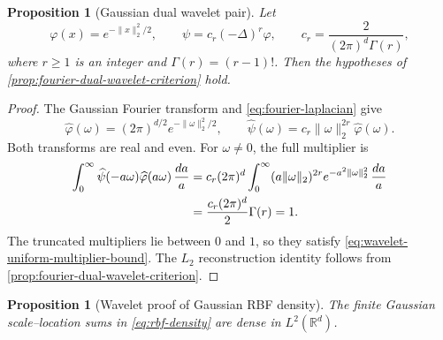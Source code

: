 \documentclass[11pt,twoside]{article}
\newcommand{\R}{\mathbb R}
\newtheorem{proposition}[theorem]{Proposition}
\theoremstyle{definition}
\theoremstyle{remark}
\begin{document}
\begin{proposition}[Gaussian dual wavelet pair]
\label{prop:gaussian-wavelet-verification}
Let
\begin{equation}
 \varphi(x)=e^{-\|x\|_2^2/2},
 \qquad
 \psi=c_r(-\Delta)^r\varphi,
 \qquad
 c_r=\frac{2}{(2\pi)^d\Gamma(r)},
 \label{eq:normalized-gaussian-wavelet-pair}
\end{equation}
where $r\geq1$ is an integer and $\Gamma(r)=(r-1)!$. Then the hypotheses of
\cref{prop:fourier-dual-wavelet-criterion} hold.
\end{proposition}

\begin{proof}
The Gaussian Fourier transform and \cref{eq:fourier-laplacian} give
\begin{equation}
 \widehat\varphi(\omega)=(2\pi)^{d/2}e^{-\|\omega\|_2^2/2},
 \qquad
 \widehat\psi(\omega)
 =c_r\|\omega\|_2^{2r}\widehat\varphi(\omega).
 \label{eq:gaussian-wavelet-fourier-transforms}
\end{equation}
Both transforms are real and even. For $\omega\neq0$, the full multiplier is
\begin{align}
 \int_0^\infty
 \widehat\psi(-a\omega)\widehat\varphi(a\omega)\,\frac{da}{a}
 &=c_r(2\pi)^d\int_0^\infty
 (a\|\omega\|_2)^{2r}e^{-a^2\|\omega\|_2^2}\,\frac{da}{a}\notag\\
 &=\frac{c_r(2\pi)^d}{2}\Gamma(r)=1.
 \label{eq:gaussian-wavelet-multiplier-one}
\end{align}
The truncated multipliers lie between $0$ and $1$, so they satisfy
\cref{eq:wavelet-uniform-multiplier-bound}. The $L_2$ reconstruction identity follows from
\cref{prop:fourier-dual-wavelet-criterion}.
\end{proof}

\begin{proposition}[Wavelet proof of Gaussian RBF density]
\label{prop:gaussian-rbf-density-proof}
The finite Gaussian scale--location sums in \cref{eq:rbf-density} are dense
in $L^2(\R^d)$.
\end{proposition}
\end{document}
